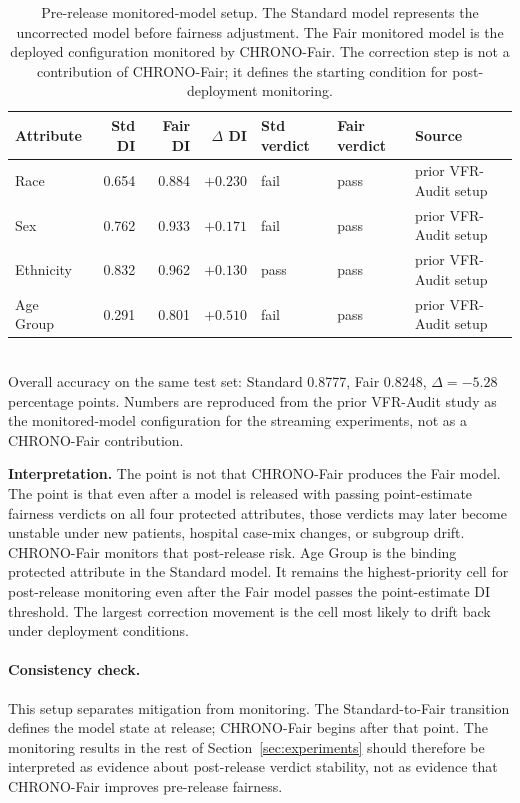 \documentclass[acmsmall,nonacm,review,anonymous]{acmart}
\newcommand{\1}[1]{\mathbf{1}\!\left\{#1\right\}}
\begin{document}
\begin{table}[t]
\centering
\caption{Pre-release monitored-model setup. The Standard model represents the uncorrected model before fairness adjustment. The Fair monitored model is the deployed configuration monitored by CHRONO-Fair. The correction step is not a contribution of CHRONO-Fair; it defines the starting condition for post-deployment monitoring.}
\label{tab:prerelease}
\small
\begin{tabular}{l r r r l l l}
\toprule
Attribute & Std DI & Fair DI & $\Delta$ DI & Std verdict & Fair verdict & Source \\
\midrule
Race      & 0.654 & 0.884 & $+0.230$ & fail & pass & prior VFR-Audit setup \\
Sex       & 0.762 & 0.933 & $+0.171$ & fail & pass & prior VFR-Audit setup \\
Ethnicity & 0.832 & 0.962 & $+0.130$ & pass & pass & prior VFR-Audit setup \\
Age Group & 0.291 & 0.801 & $+0.510$ & fail & pass & prior VFR-Audit setup \\
\bottomrule
\end{tabular}
\\[3pt]
{\footnotesize Overall accuracy on the same test set: Standard 0.8777, Fair 0.8248, $\Delta = -5.28$ percentage points. Numbers are reproduced from the prior VFR-Audit study \cite{joy2025vfr} as the monitored-model configuration for the streaming experiments, not as a CHRONO-Fair contribution.}
\end{table}

\textbf{Interpretation.}
The point is not that CHRONO-Fair produces the Fair model. The point is that even after a model is released with passing point-estimate fairness verdicts on all four protected attributes, those verdicts may later become unstable under new patients, hospital case-mix changes, or subgroup drift. CHRONO-Fair monitors that post-release risk. Age Group is the binding protected attribute in the Standard model. It remains the highest-priority cell for post-release monitoring even after the Fair model passes the point-estimate DI threshold. The largest correction movement is the cell most likely to drift back under deployment conditions.

\paragraph{Consistency check.}
This setup separates mitigation from monitoring. The Standard-to-Fair transition defines the model state at release; CHRONO-Fair begins after that point. The monitoring results in the rest of Section~\ref{sec:experiments} should therefore be interpreted as evidence about post-release verdict stability, not as evidence that CHRONO-Fair improves pre-release fairness.
\end{document}
